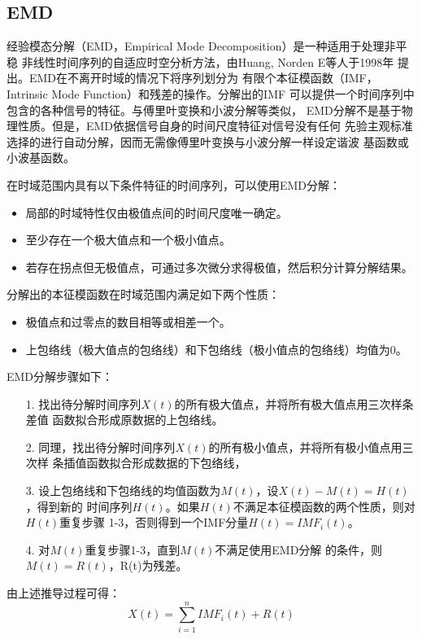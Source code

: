 \documentclass[AutoFakeBold]{LZUThesis}
\begin{document}
\subsection{EMD}
经验模态分解（EMD，Empirical Mode Decomposition）是一种适用于处理非平稳
非线性时间序列的自适应时空分析方法，由Huang, Norden E等人于1998年
提出\cite{huang1998empirical}。EMD在不离开时域的情况下将序列划分为
有限个本征模函数（IMF，Intrinsic Mode Function）和残差的操作。分解出的IMF
可以提供一个时间序列中包含的各种信号的特征。与傅里叶变换和小波分解等类似，
EMD分解不是基于物理性质。但是，EMD依据信号自身的时间尺度特征对信号没有任何
先验主观标准选择的进行自动分解，因而无需像傅里叶变换与小波分解一样设定谐波
基函数或小波基函数。

在时域范围内具有以下条件特征的时间序列，可以使用EMD分解：
\begin{itemize}
\item 局部的时域特性仅由极值点间的时间尺度唯一确定。
\item 至少存在一个极大值点和一个极小值点。
\item 若存在拐点但无极值点，可通过多次微分求得极值，然后积分计算分解结果。
\end{itemize}

分解出的本征模函数在时域范围内满足如下两个性质：
\begin{itemize}
\item 极值点和过零点的数目相等或相差一个。
\item 上包络线（极大值点的包络线）和下包络线（极小值点的包络线）均值为0。
\end{itemize}

EMD分解步骤如下：
\begin{itemize}
\item[1. ] 找出待分解时间序列$X(t)$的所有极大值点，并将所有极大值点用三次样条差值
函数拟合形成原数据的上包络线。
\item[2. ] 同理，找出待分解时间序列$X(t)$的所有极小值点，并将所有极小值点用三次样
条插值函数拟合形成数据的下包络线，
\item[3. ] 设上包络线和下包络线的均值函数为$M(t)$，设$X(t)-M(t)=H(t)$，得到新的
时间序列$H(t)$。如果$H(t)$不满足本征模函数的两个性质，则对$H(t)$重复步骤
1-3，否则得到一个IMF分量$H(t)=IMF_i(t)$。
\item[4. ] 对$M(t)$重复步骤1-3，直到$M(t)$不满足使用EMD分解
的条件，则$M(t)=R(t)$，R(t)为残差。
\end{itemize}

由上述推导过程可得：
$$
X(t)=\displaystyle\sum_{i=1} ^n IMF_i(t) +R(t)
$$
\end{document}
